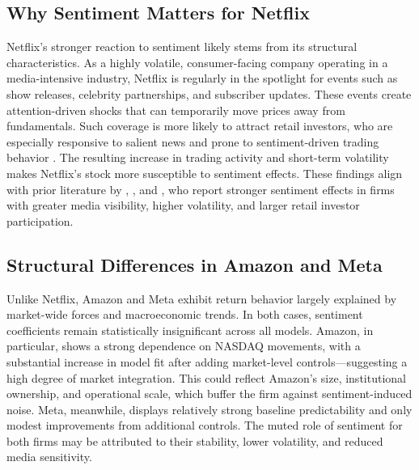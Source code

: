 \documentclass[12pt]{article}
\begin{document}
\subsection{ Why Sentiment Matters for Netflix}
Netflix’s stronger reaction to sentiment likely stems from its structural characteristics. As a highly volatile, consumer-facing company operating in a media-intensive industry, Netflix is regularly in the spotlight for events such as show releases, celebrity partnerships, and subscriber updates. These events create attention-driven shocks that can temporarily move prices away from fundamentals. Such coverage is more likely to attract retail investors, who are especially responsive to salient news and prone to sentiment-driven trading behavior \citep{barber2008all}. The resulting increase in trading activity and short-term volatility makes Netflix’s stock more susceptible to sentiment effects. These findings align with prior literature by \cite{tetlock2007giving}, \cite{chen2014wisdom}, and \cite{cristescu2023wavelet}, who report stronger sentiment effects in firms with greater media visibility, higher volatility, and larger retail investor participation.

\subsection{ Structural Differences in Amazon and Meta}
Unlike Netflix, Amazon and Meta exhibit return behavior largely explained by market-wide forces and macroeconomic trends. In both cases, sentiment coefficients remain statistically insignificant across all models. Amazon, in particular, shows a strong dependence on NASDAQ movements, with a substantial increase in model fit after adding market-level controls—suggesting a high degree of market integration. This could reflect Amazon’s size, institutional ownership, and operational scale, which buffer the firm against sentiment-induced noise. Meta, meanwhile, displays relatively strong baseline predictability and only modest improvements from additional controls. The muted role of sentiment for both firms may be attributed to their stability, lower volatility, and reduced media sensitivity.
\end{document}
